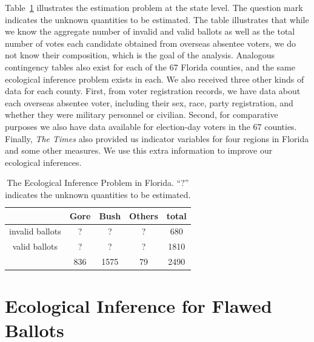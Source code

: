 \documentclass[11pt,titlepage]{article}
\begin{document}
Table~\ref{tb:ballots} illustrates the estimation problem at the state
level. The question mark indicates the unknown quantities to be
estimated.  The table illustrates that while we know the aggregate
number of invalid and valid ballots as well as the total number of
votes each candidate obtained from overseas absentee voters, we do not
know their composition, which is the goal of the analysis.  Analogous
contingency tables also exist for each of the 67 Florida counties, and
the same ecological inference problem exists in each. We also received
three other kinds of data for each county.  First, from voter
registration records, we have data about each overseas absentee voter,
including their sex, race, party registration, and whether they were
military personnel or civilian.  Second, for comparative purposes we
also have data available for election-day voters in the 67 counties.
Finally, \emph{The Times} also provided us indicator variables for
four regions in Florida and some other measures.  We use this extra
information to improve our ecological inferences.
\begin{table}[t]
  \begin{center}
    \begin{tabular}{ccccc}
      & Gore  & Bush & Others & total  \\
      \hline 
      invalid ballots &   ?   &   ?  &   ?    &  680   \\
      valid ballots   &   ?   &   ?  &   ?    & 1810   \\
      \hline
      & 836   & 1575 &   79   & 2490   \\
    \end{tabular} \caption{The Ecological Inference Problem in Florida.  
      ``?'' indicates the unknown quantities to be
      estimated.}\label{tb:ballots}
  \end{center}
\end{table} 

\section{Ecological Inference for Flawed Ballots} \label{s:ecinf}
\end{document}

